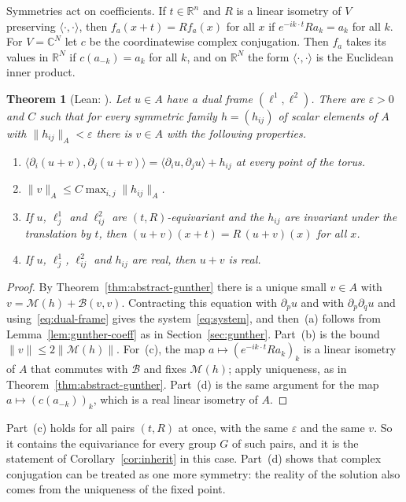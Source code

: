 \documentclass[11pt]{amsart}
\newtheorem{theorem}{Theorem}[section]
\theoremstyle{definition}
\newcommand{\R}{\mathbb{R}}
\newcommand{\inner}[2]{\langle #1, #2\rangle}
\newcommand{\cM}{\mathcal{M}}
\newcommand{\cB}{\mathcal{B}}
\newcommand{\lean}[1]{\texttt{\detokenize{#1}}}
\begin{document}
Symmetries act on coefficients. If $t\in\R^n$ and $R$ is a linear isometry of $V$ preserving
$\inner{\cdot}{\cdot}$, then $f_a(x+t)=Rf_a(x)$ for all $x$ if $e^{-ik\cdot t}Ra_k=a_k$ for all
$k$. For $V=\mathbb C^N$ let $c$ be the coordinatewise complex conjugation. Then $f_a$ takes its
values in $\R^N$ if $c(a_{-k})=a_k$ for all $k$, and on $\R^N$ the form $\inner{\cdot}{\cdot}$ is
the Euclidean inner product.

\begin{theorem}[Lean: \lean{flat_torus_equivariant_perturbation}]\label{thm:torus}
Let $u\in A$ have a dual frame $(\ell^1,\ell^2)$. There are $\varepsilon>0$ and $C$ such that for
every symmetric family $h=(h_{ij})$ of scalar elements of $A$ with $\|h_{ij}\|_A<\varepsilon$ there
is $v\in A$ with the following properties.
\begin{enumerate}[label=(\alph*)]
\item $\inner{\partial_i(u+v)}{\partial_j(u+v)}=\inner{\partial_iu}{\partial_ju}+h_{ij}$ at every
point of the torus.
\item $\|v\|_A\le C\max_{i,j}\|h_{ij}\|_A$.
\item If $u$, $\ell^1_j$ and $\ell^2_{ij}$ are $(t,R)$-equivariant and the $h_{ij}$ are invariant
under the translation by $t$, then $(u+v)(x+t)=R\,(u+v)(x)$ for all $x$.
\item If $u$, $\ell^1_j$, $\ell^2_{ij}$ and $h_{ij}$ are real, then $u+v$ is real.
\end{enumerate}
\end{theorem}

\begin{proof}
By Theorem~\ref{thm:abstract-gunther} there is a unique small $v\in A$ with
$v=\cM(h)+\cB(v,v)$. Contracting this equation with $\partial_pu$ and with
$\partial_p\partial_qu$ and using~\eqref{eq:dual-frame} gives the system~\eqref{eq:system}, and
then~(a) follows from Lemma~\ref{lem:gunther-coeff} as in Section~\ref{sec:gunther}. Part~(b) is
the bound $\|v\|\le2\|\cM(h)\|$. For~(c), the map $a\mapsto(e^{-ik\cdot t}Ra_k)_k$ is a linear
isometry of $A$ that commutes with $\cB$ and fixes $\cM(h)$; apply uniqueness, as in
Theorem~\ref{thm:abstract-gunther}. Part~(d) is the same argument for the map
$a\mapsto(c(a_{-k}))_k$, which is a real linear isometry of $A$.
\end{proof}

Part~(c) holds for all pairs $(t,R)$ at once, with the same $\varepsilon$ and the same $v$. So it
contains the equivariance for every group $G$ of such pairs, and it is the statement of
Corollary~\ref{cor:inherit} in this case. Part~(d) shows that complex conjugation can be treated
as one more symmetry: the reality of the solution also comes from the uniqueness of the fixed
point.
\end{document}
